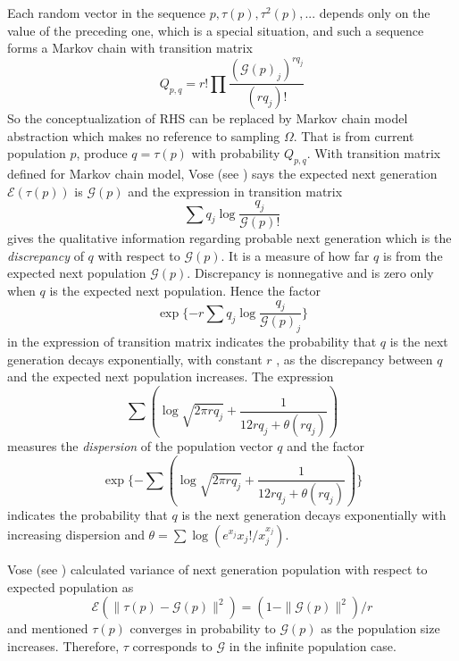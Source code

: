 Each random vector in the sequence $p, \tau(p), \tau^2(p),...$ depends only on the value of the preceding one, which is a special situation, and such a sequence forms a Markov chain with
transition matrix
\[
Q_{p,q} = r! \prod \frac{(\mathcal{G}(p)_j)^{rq_j}}{(rq_j)!}
\]
So the conceptualization of RHS can be replaced by Markov chain model abstraction which makes no reference to sampling $\Omega$. That is from current population $p$, produce $q = \tau (p)$ with probability $Q_{p,q}$. With transition matrix defined for Markov chain model, Vose (see \cite{Vose1999}) says the expected next generation $\mathcal{E}(\tau (p))$ is $\mathcal{G}(p)$ and the expression in transition matrix
\[
\sum q_j \log \frac{q_j}{\mathcal{G}(p)!}
\]
gives the qualitative information regarding probable next generation which is the {\em discrepancy} of $q$ with respect to $\mathcal{G}(p)$. It is a measure of how far $q$ is from the expected next population $\mathcal{G}(p)$. Discrepancy is nonnegative and is zero only when $q$ is the expected next population. Hence the factor 
\[
\exp\{-r \sum q_j \log \frac{q_j}{\mathcal{G}(p)_j}\}
\]
in the expression of transition matrix indicates the probability that $q$ is the next generation
decays exponentially, with constant $r$ , as the discrepancy between $q$ and the
expected next population increases.
The expression 
\[
\sum (\log \sqrt{2 \pi rq_j} + \frac{1}{12rq_j + \theta (rq_j)})
\]
measures the {\em dispersion} of the population vector $q$ and the factor
\[
\exp\{- \sum (\log \sqrt{2 \pi rq_j} + \frac{1}{12rq_j + \theta (rq_j)})\}
\]
indicates the probability that $q$ is the next generation decays exponentially with increasing dispersion and 
$\theta  =  \sum \log(e^{x_j}x_j!/x_j^{x_j})$.

Vose (see \cite{Vose1999}) calculated variance of next generation population with respect to expected population as 
\[
\mathcal{E}(\| \tau (p) - \mathcal{G}(p) \|^2) = (1 - \|\mathcal{G}(p)\|^2) / r
\]
and mentioned $\tau (p)$ converges in probability to $\mathcal{G}(p)$ as the population size increases. Therefore, $\tau$ corresponds to $\mathcal{G}$ in the infinite
population case.





